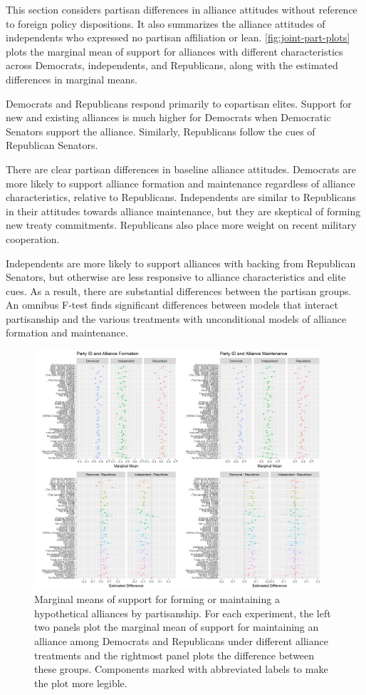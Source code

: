 \documentclass[12pt]{article}
\begin{document}
This section considers partisan differences in alliance attitudes without reference to foreign policy dispositions. 
It also summarizes the alliance attitudes of independents who expressed no partisan affiliation or lean. 
\autoref{fig:joint-part-plots} plots the marginal mean of support for alliances with different characteristics across Democrats, independents, and Republicans, along with the estimated differences in marginal means. 


Democrats and Republicans respond primarily to copartisan elites.
Support for new and existing alliances is much higher for Democrats when Democratic Senators support the alliance.
Similarly, Republicans follow the cues of Republican Senators.


There are clear partisan differences in baseline alliance attitudes.
Democrats are more likely to support alliance formation and maintenance regardless of alliance characteristics, relative to Republicans. 
Independents are similar to Republicans in their attitudes towards alliance maintenance, but they are skeptical of forming new treaty commitments. 
Republicans also place more weight on recent military cooperation. 


Independents are more likely to support alliances with backing from Republican Senators, but otherwise are less responsive to alliance characteristics and elite cues. 
As a result, there are substantial differences between the partisan groups. 
An omnibus F-test finds significant differences between models that interact partisanship and the various treatments with unconditional models of alliance formation and maintenance. 


\begin{figure}
	\centering
		\includegraphics[width=0.95\textwidth]{joint-part-plots.png}
	\caption{Marginal means of support for forming or maintaining a hypothetical alliances by partisanship. For each experiment, the left two panels plot the marginal mean of support for maintaining an alliance among Democrats and Republicans under different alliance treatments and the rightmost panel plots the difference between these groups. Components marked with abbreviated labels to make the plot more legible.}
	\label{fig:joint-part-plots}
\end{figure}
\end{document}
